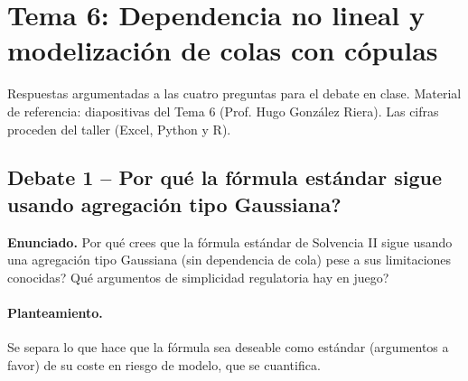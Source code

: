 \documentclass[a4paper,12pt]{article}
\begin{document}
\restoregeometry
\newpage
{}
\setcounter{page}{1}


\section{Tema 6: Dependencia no lineal y modelización de colas con cópulas}
\label{sec:tema6debate}
\noindent
Respuestas argumentadas a las cuatro preguntas para el debate en clase. Material de referencia: diapositivas del Tema 6 (Prof. Hugo González Riera). Las cifras proceden del taller (Excel, Python y R).

\subsection{Debate 1 -- \textquestiondown{}Por qué la fórmula estándar sigue usando agregación tipo Gaussiana?}

\noindent\textbf{Enunciado.} \textquestiondown{}Por qué crees que la fórmula estándar de Solvencia II sigue usando una agregación tipo Gaussiana (sin dependencia de cola) pese a sus limitaciones conocidas? \textquestiondown{}Qué argumentos de simplicidad regulatoria hay en juego?

\paragraph{Planteamiento.} Se separa lo que hace que la fórmula sea deseable como estándar (argumentos a favor) de su coste en riesgo de modelo, que se cuantifica.
\end{document}
